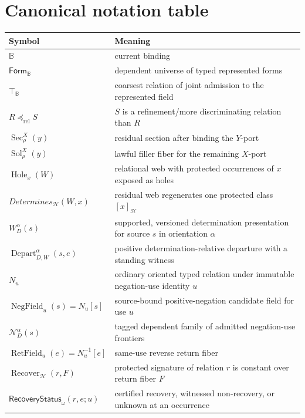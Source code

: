 \documentclass[11pt,oneside]{article}
\newcommand{\B}{\mathbb B}
\newcommand{\Depart}{\operatorname{Depart}}
\newcommand{\NegField}{\operatorname{NegField}}
\newcommand{\RetField}{\operatorname{RetField}}
\newcommand{\Recover}{\operatorname{Recover}}
\begin{document}
\clearpage
\appendix

\section{Canonical notation table}

\begin{longtable}{>{\raggedright\arraybackslash}p{}
                  >{\raggedright\arraybackslash}p{}}
\toprule
Symbol & Meaning\\
\midrule
\endhead
\(\B\) & current binding\\
\(\mathsf{Form}_{\B}\) & dependent universe of typed represented forms\\
\(\top_{\B}\) & coarsest relation of joint admission to the represented field\\
\(R\preceq_{\mathrm{rel}}S\) & \(S\) is a refinement/more discriminating relation than \(R\)\\
\(\operatorname{Sec}^{X}_{\rho}(y)\) & residual section after binding the \(Y\)-port\\
\(\operatorname{Sol}^{X}_{\rho}(y)\) & lawful filler fiber for the remaining \(X\)-port\\
\(\operatorname{Hole}_x(W)\) & relational web with protected occurrences of \(x\) exposed as holes\\
\(Determines_{\mathcal H}(W,x)\) & residual web regenerates one protected class \([x]_{\mathcal H}\)\\
\(W_D^\alpha(s)\) & supported, versioned determination presentation for source \(s\) in orientation \(\alpha\)\\
\(\Depart_{D,W}^{\alpha}(s,e)\) & positive determination-relative departure with a standing witness\\
\(N_u\) & ordinary oriented typed relation under immutable negation-use identity \(u\)\\
\(\NegField_u(s)=N_u[s]\) & source-bound positive-negation candidate field for use \(u\)\\
\(\mathcal N_D^\alpha(s)\) & tagged dependent family of admitted negation-use frontiers\\
\(\RetField_u(e)=N_u^{-1}[e]\) & same-use reverse return fiber\\
\(\Recover_{\mathcal H}(r,F)\) & protected signature of relation \(r\) is constant over return fiber \(F\)\\
\(\mathsf{RecoveryStatus}_{\omega}(r,e;u)\) & certified recovery, witnessed non-recovery, or unknown at an occurrence\\

\end{longtable}
\end{document}
